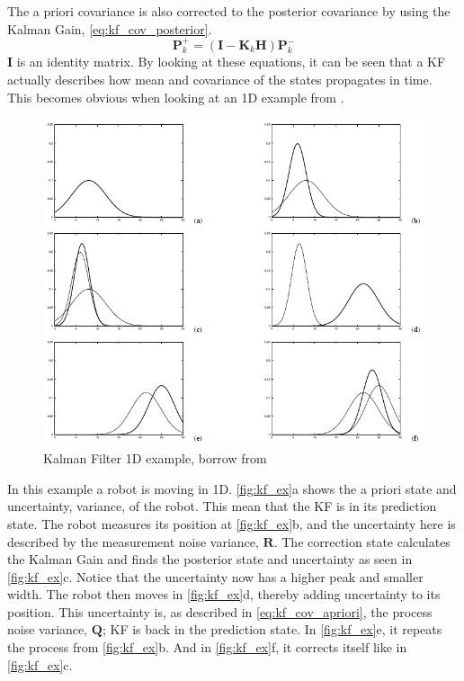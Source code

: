 \documentclass[Main]{subfiles}
\begin{document}
The a priori covariance is also corrected to the posterior covariance by using the Kalman Gain, \autoref{eq:kf_cov_posterior}.
\begin{equation}
\label{eq:kf_cov_posterior}
\mathbf{P}_k^+ = (\mathbf{I} - \mathbf{K}_k \mathbf{H}) \mathbf{P}_k^-
\end{equation}
$\mathbf{I}$ is an identity matrix.
By looking at these equations, it can be seen that a KF actually describes how mean and covariance of the states propagates in time.
This becomes obvious when looking at an 1D example from \citep{Thrun2002}.
\begin{figure}[H]
	\centering
	\includegraphics[width=0.8\linewidth]{./Figures/kf_ex.png}
	\caption{Kalman Filter 1D example, borrow from \citep{Thrun2002}}
	\label{fig:kf_ex}
\end{figure}\noindent
In this example a robot is moving in 1D.
\autoref{fig:kf_ex}a shows the a priori state and uncertainty, variance, of the robot.
This mean that the KF is in its prediction state.
The robot measures its position at \autoref{fig:kf_ex}b, and the uncertainty here is described by the measurement noise variance, $\mathbf{R}$.
The correction state calculates the Kalman Gain and finds the posterior state and uncertainty as seen in \autoref{fig:kf_ex}c.
Notice that the uncertainty now has a higher peak and smaller width.
The robot then moves in \autoref{fig:kf_ex}d, thereby adding uncertainty to its position.
This uncertainty is, as described in \autoref{eq:kf_cov_apriori}, the process noise variance, $\mathbf{Q}$; KF is back in the prediction state.
In \autoref{fig:kf_ex}e, it repeats the process from \autoref{fig:kf_ex}b.
And in \autoref{fig:kf_ex}f, it corrects itself like in \autoref{fig:kf_ex}c.
\end{document}

